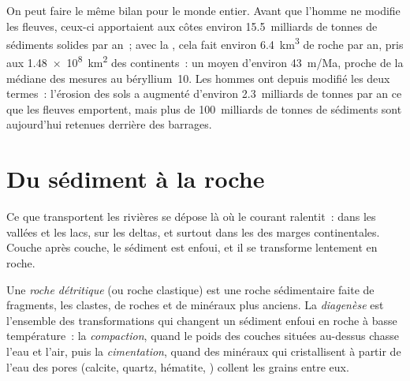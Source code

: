 On peut faire le même bilan pour le monde entier. Avant que l'homme ne
modifie les fleuves, ceux-ci apportaient aux côtes environ 15.5~milliards
de tonnes de sédiments solides par an~; avec la , cela fait
environ \qty{6.4}{km^3} de roche par an, pris aux \qty{1.48e8}{km^2} des
continents~: un  moyen d'environ \qty{43}{m/Ma}, proche
de la médiane des mesures au béryllium~10. Les hommes ont depuis modifié
les deux termes~: l'érosion des sols a augmenté d'environ 2.3~milliards de
tonnes par an ce que les fleuves emportent, mais plus de 100~milliards de
tonnes de sédiments sont aujourd'hui retenues derrière des barrages.

\section{Du sédiment à la roche}

Ce que transportent les rivières se dépose là où le courant ralentit~: dans
les vallées et les lacs, sur les deltas, et surtout dans les  des marges continentales. Couche après couche, le sédiment est
enfoui, et il se transforme lentement en roche.

\begin{definition}\label{def:g12:destruction-of-mountains:diagenesis}
Une \emph{roche détritique} (ou
roche clastique) est une roche sédimentaire faite de fragments, les clastes,
de roches et de minéraux plus anciens. La
\emph{diagenèse} est l'ensemble des
transformations qui changent un sédiment enfoui en roche à basse
température~: la \emph{compaction}, quand le poids des couches situées
au-dessus chasse l'eau et l'air, puis la \emph{cimentation}, quand des
minéraux qui cristallisent à partir de l'eau des pores (calcite, quartz,
hématite, ) collent les grains entre eux.
\end{definition}

